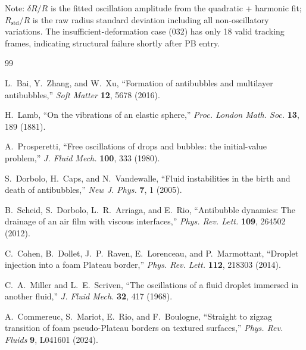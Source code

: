 \documentclass[%
 preprint,
 superscriptaddress,
 amsmath,amssymb,
 aps, prl,
]{revtex4-2}
\begin{document}
Note: $\delta R/R$ is the fitted oscillation amplitude from the
quadratic + harmonic fit; $R_{\text{std}}/R$ is the raw radius standard
deviation including all non-oscillatory variations.
The insufficient-deformation case (032) has only 18 valid tracking frames,
indicating structural failure shortly after PB entry.


\begin{thebibliography}{99}

L.~Bai, Y.~Zhang, and W.~Xu,
``Formation of antibubbles and multilayer antibubbles,''
\textit{Soft Matter} \textbf{12}, 5678 (2016).

H.~Lamb,
``On the vibrations of an elastic sphere,''
\textit{Proc. London Math. Soc.} \textbf{13}, 189 (1881).

A.~Prosperetti,
``Free oscillations of drops and bubbles: the initial-value problem,''
\textit{J. Fluid Mech.} \textbf{100}, 333 (1980).

S.~Dorbolo, H.~Caps, and N.~Vandewalle,
``Fluid instabilities in the birth and death of antibubbles,''
\textit{New J. Phys.} \textbf{7}, 1 (2005).

B.~Scheid, S.~Dorbolo, L.~R.~Arriaga, and E.~Rio,
``Antibubble dynamics: The drainage of an air film with viscous interfaces,''
\textit{Phys. Rev. Lett.} \textbf{109}, 264502 (2012).

C.~Cohen, B.~Dollet, J.~P.~Raven, E.~Lorenceau, and P.~Marmottant,
``Droplet injection into a foam Plateau border,''
\textit{Phys. Rev. Lett.} \textbf{112}, 218303 (2014).

C.~A.~Miller and L.~E.~Scriven,
``The oscillations of a fluid droplet immersed in another fluid,''
\textit{J. Fluid Mech.} \textbf{32}, 417 (1968).

A.~Commereuc, S.~Mariot, E.~Rio, and F.~Boulogne,
``Straight to zigzag transition of foam pseudo-Plateau borders on textured surfaces,''
\textit{Phys. Rev. Fluids} \textbf{9}, L041601 (2024).

\end{thebibliography}
\end{document}
